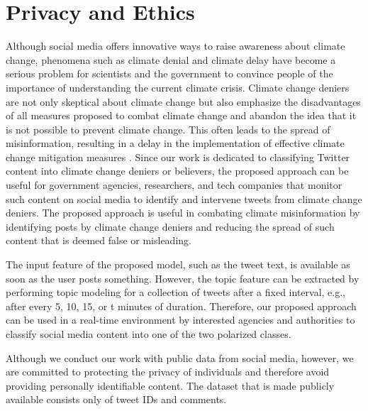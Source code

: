 \documentclass[letterpaper]{article} %
\begin{document}
\section{Privacy and Ethics}
Although social media offers innovative ways to raise awareness about climate change, phenomena such as climate denial and climate delay have become a serious problem for scientists and the government to convince people of the importance of understanding the current climate crisis. Climate change deniers are not only skeptical about climate change but also emphasize the disadvantages of all measures proposed to combat climate change and abandon the idea that it is not possible to prevent climate change. This often leads to the spread of misinformation, resulting in a delay in the implementation of effective climate change mitigation measures \cite{zhou2021confirmation}. Since our work is dedicated to classifying Twitter content into climate change deniers or believers, the proposed approach can be useful for government agencies, researchers, and tech companies that monitor such content on social media to identify and intervene tweets from climate change deniers. The proposed approach is useful in combating climate misinformation by identifying posts by climate change deniers and reducing the spread of such content that is deemed false or misleading.
\par \noindent The input feature of the proposed model, such as the tweet text, is available as soon as the user posts something. However, the topic feature can be extracted by performing topic modeling for a collection of tweets after a fixed interval, e.g., after every 5, 10, 15, or t minutes of duration. Therefore, our proposed approach can be used in a real-time environment by interested agencies and authorities to classify social media content into one of the two polarized classes.
\par \noindent Although we conduct our work with public data from social media, however, we are committed to protecting the privacy of individuals and therefore avoid providing personally identifiable content. The dataset that is made publicly available consists only of tweet IDs and comments.
\end{document}
